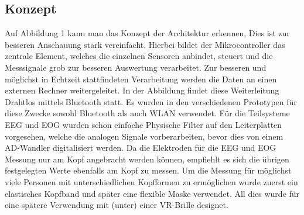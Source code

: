 \subsection{Konzept} \label{konzept-1}

Auf Abbildung 1 kann man das Konzept der Architektur erkennen, Dies ist zur besseren Anschauung stark vereinfacht. Hierbei bildet der Mikrocontroller das zentrale Element, welches die einzelnen Sensoren anbindet, steuert und die Messsignale grob zur besseren Auswertung verarbeitet. Zur besseren und möglichst in Echtzeit stattfindeten Verarbeitung werden die Daten an einen externen Rechner weitergeleitet. In der Abbildung findet diese Weiterleitung Drahtlos mittels Bluetooth statt. Es wurden in den verschiedenen Prototypen für diese Zwecke sowohl Bluetooth als auch WLAN verwendet. Für die Teilsysteme EEG und EOG wurden schon einfache Physische Filter auf den Leiterplatten vorgesehen, welche die analogen Signale vorberarbeiten, bevor dies von einem AD-Wandler digitalisiert werden. Da die Elektroden für die EEG und EOG Messung nur am Kopf angebracht werden können, empfiehlt es sich die übrigen festgelegten Werte ebenfalls am Kopf zu messen. Um die Messung für möglichst viele Personen mit unterschiedlichen Kopfformen zu ermöglichen wurde zuerst ein elastisches Kopfband und später eine flexible Maske verwendet. All dies wurde für eine spätere Verwendung mit (unter) einer VR-Brille designet. 



